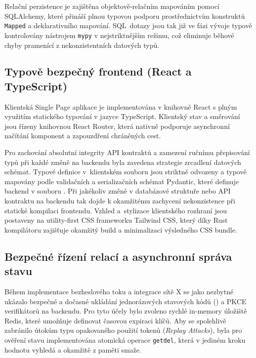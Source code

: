 \documentclass[male,czech,api_bc]{kitheses}
\begin{document}
Relační perzistence je zajištěna objektově-relačním mapováním pomocí SQLAlchemy, které přináší plnou typovou podporu prostřednictvím konstruktů \texttt{Mapped} a deklarativního mapování. SQL~dotazy jsou tak již ve fázi vývoje typově kontrolovány nástrojem \texttt{mypy} v nejstriktnějším režimu, což eliminuje běhové chyby pramenící z nekonzistentních datových typů.

\subsection{Typově bezpečný frontend (React a TypeScript)}

Klientská Single Page aplikace je implementována v knihovně React s plným využitím statického typování v jazyce TypeScript. Klientský stav a směrování jsou řízeny knihovnou React Router, která nativně podporuje asynchronní načítání komponent a zapouzdření chráněných cest. 

Pro zachování absolutní integrity API kontraktů a zamezení ručnímu přepisování typů při každé změně na backendu byla zavedena strategie zrcadlení datových schémat. Typové definice v~klientském souboru  jsou striktně odvozeny a typově mapovány podle validačních a serializačních schémat Pydantic, které definuje backend v souboru . Při jakékoliv změně v databázové struktuře nebo API kontraktu na backendu tak dojde k okamžitému zachycení nekonzistence při statické kompilaci frontendu. Vzhled a~stylizace klientského rozhraní jsou postaveny na utility-first CSS frameworku Tailwind CSS, který díky Rust kompilátoru zajišťuje okamžitý build a minimalizaci výsledného CSS bundle.

\subsection{Bezpečné řízení relací a asynchronní správa stavu}
\label{sec:rizeni_relaci}

Během implementace bezheslového toku a integrace sítě X se jako nezbytné ukázalo bezpečné a dočasné ukládání jednorázových stavových kódů () a PKCE verifikátorů na backendu. Pro tyto účely bylo zvoleno rychlé in-memory úložiště Redis, které umožňuje definovat časovou expiraci klíčů. Aby se spolehlivě zabránilo útokům typu opakovaného použití tokenů (\textit{Replay Attacks}), byla pro ověření stavu implementována atomická operace \texttt{getdel}, která v jediném kroku hodnotu vyhledá a okamžitě z paměti smaže.
\end{document}
